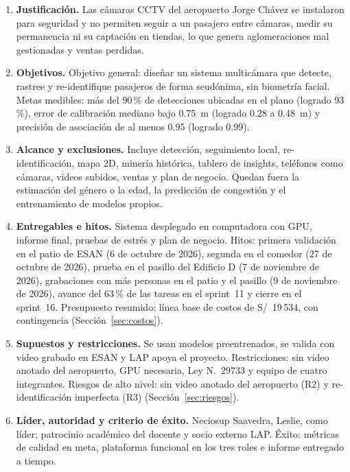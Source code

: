 \documentclass[12pt,a4paper]{article}
\begin{document}
\begin{enumerate}
    \item \textbf{Justificación.} Las cámaras CCTV del aeropuerto Jorge Chávez
    se instalaron para seguridad y no permiten seguir a un pasajero entre
    cámaras, medir su permanencia ni su captación en tiendas, lo que genera
    aglomeraciones mal gestionadas y ventas perdidas.

    \item \textbf{Objetivos.} Objetivo general: diseñar un sistema multicámara
    que detecte, rastree y re-identifique pasajeros de forma seudónima, sin
    biometría facial. Metas medibles: más del 90\,\% de detecciones ubicadas en
    el plano (logrado 93\,\%), error de calibración mediano bajo 0.75~m
    (logrado 0.28 a 0.48~m) y precisión de asociación de al menos 0.95
    (logrado 0.99).

    \item \textbf{Alcance y exclusiones.} Incluye detección, seguimiento local,
    re-identificación, mapa 2D, minería histórica, tablero de insights,
    teléfonos como cámaras, videos subidos, ventas y plan de negocio. Quedan
    fuera la estimación del género o la edad, la predicción de congestión y el
    entrenamiento de modelos propios.

    \item \textbf{Entregables e hitos.} Sistema desplegado en computadora con
    GPU, informe final, pruebas de estrés y plan de negocio. Hitos: primera
    validación en el patio de ESAN (6 de octubre de 2026), segunda en el
    comedor (27 de octubre de 2026), prueba en el pasillo del Edificio D
    (7 de noviembre de 2026), grabaciones con más personas en el patio y el
    pasillo (9 de noviembre de 2026), avance del 63\,\% de las tareas en el
    sprint~11 y cierre en el sprint~16. Presupuesto resumido: línea base de
    costos de S/~19\,534, con contingencia (Sección~\ref{sec:costos}).

    \item \textbf{Supuestos y restricciones.} Se usan modelos preentrenados, se
    valida con video grabado en ESAN y LAP apoya el proyecto. Restricciones:
    sin video anotado del aeropuerto, GPU necesaria, Ley
    N.\textdegree~29733 y equipo de cuatro integrantes. Riesgos de alto nivel:
    sin video anotado del aeropuerto (R2) y re-identificación imperfecta (R3)
    (Sección~\ref{sec:riesgos}).

    \item \textbf{Líder, autoridad y criterio de éxito.} Neciosup Saavedra,
    Leslie, como líder; patrocinio académico del docente y socio externo LAP. Éxito: métricas de
    calidad en meta, plataforma funcional en los tres roles e informe
    entregado a tiempo.
\end{enumerate}
\end{document}
